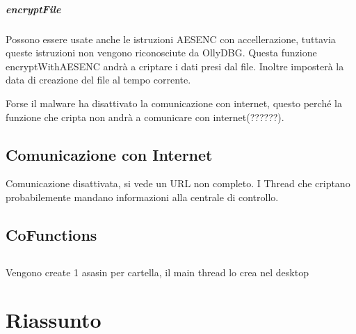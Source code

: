 \documentclass[]{article}
\begin{document}
\subparagraph{encryptFile}
Possono essere usate anche le istruzioni AESENC con accellerazione, tuttavia queste istruzioni non vengono riconosciute da OllyDBG. Questa funzione encryptWithAESENC andrà a criptare i dati presi dal file. Inoltre imposterà la data di creazione del file al tempo corrente.

Forse il malware ha disattivato la comunicazione con internet, questo perché la funzione che cripta non andrà a comunicare con internet(??????).

\subsection{Comunicazione con Internet}
Comunicazione disattivata, si vede un URL non completo. I Thread che criptano probabilemente mandano informazioni alla centrale di controllo.

\subsection{CoFunctions}


\subsection{}
Vengono create 1 asasin per cartella, il main thread lo crea nel desktop

\section{Riassunto}
\end{document}
